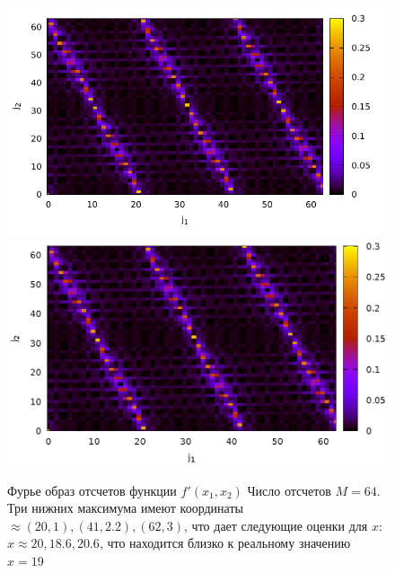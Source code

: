 \begin{figure}
\centering

\ifpdf
\includegraphics[angle=0]
{./part4/quantcomp/picdiscretlog4.pdf}
\else
\includegraphics[angle=0]
{./part4/quantcomp/picdiscretlog4.eps}
\fi

%

\caption{Фурье образ отсчетов функции 
$f'(x_1, x_2)$
Число отсчетов $M=64$. Три нижних максимума имеют координаты $\approx (20,1), (41,2.2), (62,
3)$, что дает следующие оценки для $x$: $x \approx 20, 18.6, 20.6$,
что находится близко к реальному значению $x = 19$
} 
\label{fig:part4:quantcomp:dl4}
\end{figure}
